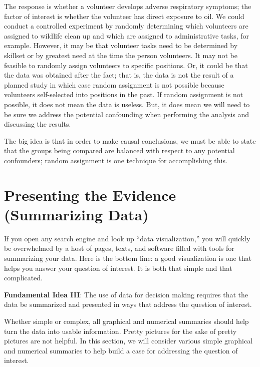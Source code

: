 \documentclass[
]{book}
\theoremstyle{plain}
\theoremstyle{mydefn}
\theoremstyle{myexmpl}
\theoremstyle{remark}
\begin{document}
The response is whether a volunteer develops adverse respiratory symptoms; the factor of interest is whether the volunteer has direct exposure to oil. We could conduct a controlled experiment by randomly determining which volunteers are assigned to wildlife clean up and which are assigned to administrative tasks, for example. However, it may be that volunteer tasks need to be determined by skillset or by greatest need at the time the person volunteers. It may not be feasible to randomly assign volunteers to specific positions. Or, it could be that the data was obtained after the fact; that is, the data is not the result of a planned study in which case random assignment is not possible because volunteers self-selected into positions in the past. If random assignment is not possible, it does not mean the data is useless. But, it does mean we will need to be sure we address the potential confounding when performing the analysis and discussing the results.

The big idea is that in order to make causal conclusions, we must be able to state that the groups being compared are balanced with respect to any potential confounders; random assignment is one technique for accomplishing this.

\hypertarget{Summaries}{%
\chapter{Presenting the Evidence (Summarizing Data)}\label{Summaries}}

If you open any search engine and look up ``data visualization,'' you will quickly be overwhelmed by a host of pages, texts, and software filled with tools for summarizing your data. Here is the bottom line: a good visualization is one that helps you answer your question of interest. It is both that simple and that complicated.

\begin{rmdfivefund}
\textbf{Fundamental Idea III}: The use of data for decision making requires that the data be summarized and presented in ways that address the question of interest.
\end{rmdfivefund}

Whether simple or complex, all graphical and numerical summaries should help turn the data into usable information. Pretty pictures for the sake of pretty pictures are not helpful. In this section, we will consider various simple graphical and numerical summaries to help build a case for addressing the question of interest.
\end{document}
